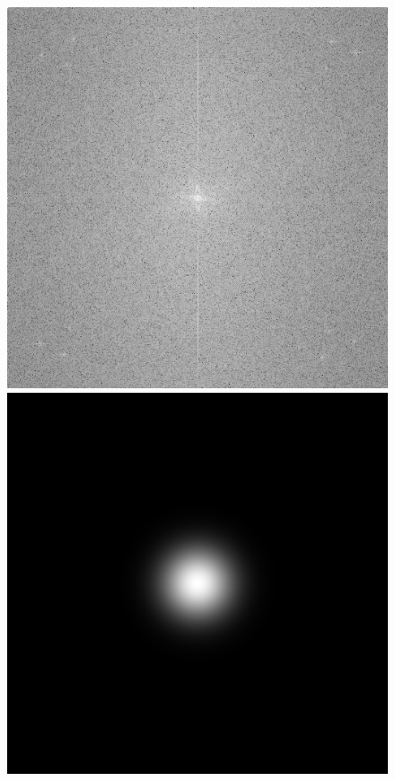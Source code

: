 \documentclass[twoside,twocolumn]{article}
\begin{document}
\begin{figure}[H]
\begin{center}
	\includegraphics[scale=.17]{figures/baboon_mag_spec_32.png}
	\includegraphics[scale=.17]{figures/baboon_gau_filter_32.png}

\end{center}
\end{figure}
\end{document}
